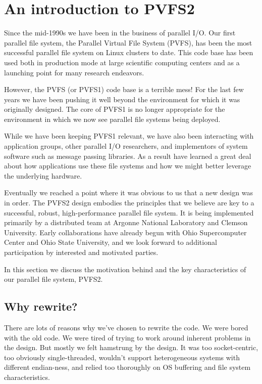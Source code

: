 \section{An introduction to PVFS2}

Since the mid-1990s we have been in the business of parallel I/O.  Our first
parallel file system, the Parallel Virtual File System (PVFS), has been the
most successful parallel file system on Linux clusters to date.  This code
base has been used both in production mode at large scientific computing
centers and as a launching point for many research endeavors.

However, the PVFS (or PVFS1) code base is a terrible mess!  For the last few
years we have been pushing it well beyond the environment for which it was
originally designed.  The core of PVFS1 is no longer appropriate for the
environment in which we now see parallel file systems being deployed.

While we have been keeping PVFS1 relevant, we have also been interacting with
application groups, other parallel I/O researchers, and implementors of system
software such as message passing libraries.  As a result have learned a great
deal about how applications use these file systems and how we might better
leverage the underlying hardware.

Eventually we reached a point where it was obvious to us that a new design was
in order.  The PVFS2 design embodies the principles that we believe are key to
a successful, robust, high-performance parallel file system.  It is being
implemented primarily by a distributed team at Argonne National Laboratory and
Clemson University.  Early collaborations have already begun with Ohio
Supercomputer Center and Ohio State University, and we look forward to
additional participation by interested and motivated parties.

In this section we discuss the motivation behind and the key characteristics
of our parallel file system, PVFS2.

\subsection{Why rewrite?}

There are lots of reasons why we've chosen to rewrite the code.  We were bored
with the old code.  We were tired of trying to work around inherent problems
in the design.  But mostly we felt hamstrung by the design.  It was too
socket-centric, too obviously single-threaded, wouldn't support heterogeneous
systems with different endian-ness, and relied too thoroughly on OS buffering
and file system characteristics.

